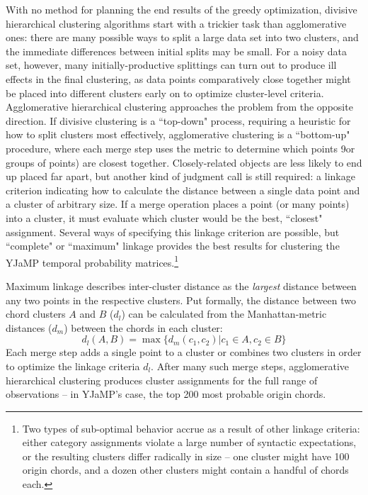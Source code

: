 With no method for planning the end results of the greedy optimization, divisive hierarchical clustering algorithms start with a trickier task than agglomerative ones: there are many possible ways to split a large data set into two clusters, and the immediate differences between initial splits may be small.  For a noisy data set, however, many initially-productive splittings can turn out to produce ill effects in the final clustering, as data points comparatively close together might be placed into different clusters early on to optimize cluster-level criteria.  Agglomerative hierarchical clustering approaches the problem from the opposite direction.  If divisive clustering is a ``top-down" process, requiring a heuristic for how to split clusters most effectively, agglomerative clustering is a ``bottom-up" procedure, where each merge step uses the metric to determine which points 9or groups of points) are closest together.  Closely-related objects are less likely to end up placed far apart, but another kind of judgment call is still required: a linkage criterion indicating how to calculate the distance between a single data point and a cluster of arbitrary size.  If a merge operation places a point (or many points) into a cluster, it must evaluate which cluster would be the best, ``closest" assignment.  Several ways of specifying this linkage criterion are possible, but ``complete" or ``maximum" linkage provides the best results for clustering the YJaMP temporal probability matrices.\footnote{Two types of sub-optimal behavior accrue as a result of other linkage criteria: either category assignments violate a large number of syntactic expectations, or the resulting clusters differ radically in size -- one cluster might have 100 origin chords, and a dozen other clusters might contain a handful of chords each.}

Maximum linkage describes inter-cluster distance as the \emph{largest} distance between any two points in the respective clusters.  Put formally, the distance between two chord clusters $A$ and $B$ ($d_l$) can be calculated from the Manhattan-metric distances ($d_m$) between the chords in each cluster:
\begin{equation}
\label{eq:d_l}
d_l(A,B) = \max \{ d_m(c_1,c_2) \vert c_1 \in A, c_2 \in B \}
\end{equation}
Each merge step adds a single point to a cluster or combines two clusters in order to optimize the linkage criteria $d_l$.  After many such merge steps, agglomerative hierarchical clustering produces cluster assignments for the full range of observations -- in YJaMP's case, the top 200 most probable origin chords.

